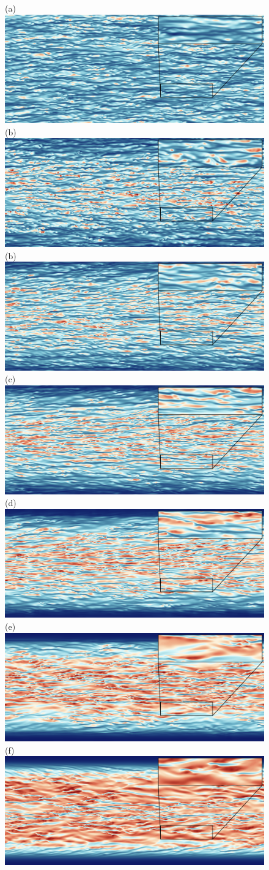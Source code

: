 \documentclass[lineno]{jfm}
\begin{document}
	\begin{figure}
		\centering
		(a) \includegraphics[width=6.cm]{Figures/unrolled_rotz0_roty0_u.png}  
                (b) \includegraphics[width=6.cm]{Figures/unrolled_rotz0_roty0.00390625_T.png} \\
		(b) \includegraphics[width=6.cm]{Figures/unrolled_rotz0_roty0.0078125_u.png}  
		(c) \includegraphics[width=6.cm]{Figures/unrolled_rotz0_roty0.015625_u.png} \\
		(d) \includegraphics[width=6.cm]{Figures/unrolled_rotz0_roty0.03125_u.png} 
                (e) \includegraphics[width=6.cm]{Figures/unrolled_rotz0_roty0.0625_u.png} \\
                (f) \includegraphics[width=6.cm]{Figures/unrolled_rotz0_roty0.125_u.png} 

\end{figure}
\end{document}
